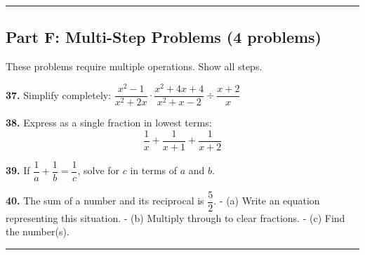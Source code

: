 \documentclass[
  11pt,
]{article}
\begin{document}
\begin{center}\rule{0.5\linewidth}{0.5pt}\end{center}

\hypertarget{part-f-multi-step-problems-4-problems}{%
\subsection{Part F: Multi-Step Problems (4
problems)}\label{part-f-multi-step-problems-4-problems}}

These problems require multiple operations. Show all steps.

\textbf{37.} Simplify completely:
\(\dfrac{x^2 - 1}{x^2 + 2x} \cdot \dfrac{x^2 + 4x + 4}{x^2 + x - 2} \div \dfrac{x + 2}{x}\)

\textbf{38.} Express as a single fraction in lowest terms:
\[\dfrac{1}{x} + \dfrac{1}{x+1} + \dfrac{1}{x+2}\]

\textbf{39.} If \(\dfrac{1}{a} + \dfrac{1}{b} = \dfrac{1}{c}\), solve
for \(c\) in terms of \(a\) and \(b\).

\textbf{40.} The sum of a number and its reciprocal is \(\dfrac{5}{2}\).
- (a) Write an equation representing this situation. - (b) Multiply
through to clear fractions. - (c) Find the number(s).

\begin{center}\rule{0.5\linewidth}{0.5pt}\end{center}
\end{document}
